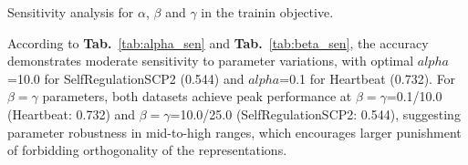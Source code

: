 \begin{researchq}
Sensitivity analysis for $\alpha$, $\beta$ and $\gamma$ in the trainin objective.
\end{researchq}

According to \textbf{Tab.}~\ref{tab:alpha_sen} and \textbf{Tab.}~\ref{tab:beta_sen}, the accuracy demonstrates moderate sensitivity to parameter variations, with optimal $alpha$=10.0 for SelfRegulationSCP2 (0.544) and $alpha$=0.1 for Heartbeat (0.732).  For $\beta=\gamma$ parameters, both datasets achieve peak performance at $\beta=\gamma$=0.1/10.0 (Heartbeat: 0.732) and $\beta=\gamma$=10.0/25.0 (SelfRegulationSCP2: 0.544), suggesting parameter robustness in mid-to-high ranges, which encourages larger punishment of forbidding orthogonality of the representations.

\begin{table}[htbp]\label{tab:alpha_sen}
    \centering
    \caption{Accuracy comparison with different $\alpha$ values.}
    \label{tab:results}
\end{table}

\begin{table}[htbp]\label{tab:beta_sen}
    \centering
    \caption{Accuracy comparison with different $\beta=\gamma$ values.}
    \label{tab:beta_results}
\end{table}






